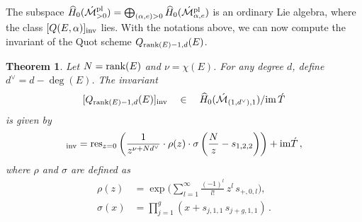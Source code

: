 \documentclass[11pt]{amsart}
\newtheorem{theorem}{Theorem}
\theoremstyle{remark}
\newcommand{\Mdash}{\acute{\mathcal{M}}}
\newcommand{\im}{\textnormal{im}\,}
\newcommand{\rk}{\textnormal{rank}}
\newcommand{\wh}[1]{\widehat{#1}}
\newcommand{\inv}[0]{\textnormal{inv}}
\newcommand{\pl}[0]{\textnormal{pl}}
\newcommand{\res}{\textnormal{res}}
\newcommand{\du}{d^\vee}
\numberwithin{theorem}{section}
\begin{document}
    The subspace $\wh{H}_0(\Mdash^\pl_{>0}) = \bigoplus_{(\alpha,e)>0} \wh{H}_0(\Mdash^\pl_{\alpha,e})$ 
    is an ordinary Lie algebra, where the class $[Q(E,\alpha)]_\inv$ lies.
With the notations above, we can now compute the invariant of the Quot scheme $Q_{\rk(E)-1,d}(E)$.
\begin{theorem}\label{theorem invariant quot N-1}
    Let $N =\rk(E)$ and $\nu = \chi(E)$.
    For any degree $d$, define $\du = d- \deg(E)$.
    The invariant 
    $$[Q_{\rk(E)-1,d}(E)]_\inv \quad  \in \quad \wh H_0(\Mdash_{(1,\du),1})/\im \acute T$$ is given by
    \begin{equation*}%
    [Q_{\rk(E)-1,d}(E)]_\inv = 
    \res_{z=0} \left( \frac{1}{z^{\nu+N\du}} \cdot \rho(z) \cdot \sigma\left(\frac{N}{z} -s_{1,2,2}\right)\right) + \textnormal{im} \acute{T}\,,
    \end{equation*}
    where $\rho$ and $\sigma$ are defined as
\begin{align}\label{equation definition rho}
    \rho (z) & = \exp \biggl(
        \sum_{l=1}^\infty \frac{(-1)^l}{l!} \, z^l \, s_{{+},0,l}
    \biggr), \\
    \nonumber
    \sigma (x) & =
    \prod_{j=1}^g {} (x + s_{j,1,1} \, s_{j+g,1,1})\,.
\end{align}
\end{theorem}
\end{document}
